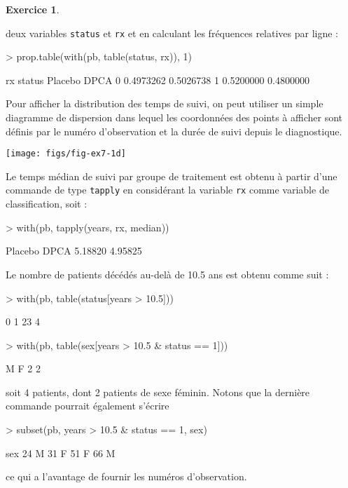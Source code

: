 \documentclass[11pt]{report}
\theoremstyle{definition}
\newtheorem{exo}{Exercice}[chapter]
\begin{document}
\begin{exo}
\begin{sol}
deux variables \texttt{status} et \texttt{rx} et en calculant les fréquences
relatives par ligne :
\begin{Schunk}
\begin{Sinput}
> prop.table(with(pb, table(status, rx)), 1)
\end{Sinput}
\begin{Soutput}
      rx
status   Placebo      DPCA
     0 0.4973262 0.5026738
     1 0.5200000 0.4800000
\end{Soutput}
\end{Schunk}
Pour afficher la distribution des temps de suivi, on peut utiliser un simple
diagramme de dispersion dans lequel les coordonnées des points à afficher
sont définis par le numéro d'observation et la durée de suivi depuis le
diagnostique. 
\begin{Schunk}
\end{Schunk}
\texttt{[image: figs/fig-ex7-1d]}

Le temps médian de suivi par groupe de traitement est obtenu à partir d'une
commande de type \texttt{tapply} en considérant la variable \texttt{rx}
comme variable de classification, soit :
\begin{Schunk}
\begin{Sinput}
> with(pb, tapply(years, rx, median))
\end{Sinput}
\begin{Soutput}
Placebo    DPCA 
5.18820 4.95825 
\end{Soutput}
\end{Schunk}
Le nombre de patients décédés au-delà de 10.5 ans est obtenu comme suit :
\begin{Schunk}
\begin{Sinput}
> with(pb, table(status[years > 10.5]))
\end{Sinput}
\begin{Soutput}
 0  1 
23  4 
\end{Soutput}
\begin{Sinput}
> with(pb, table(sex[years > 10.5 & status == 1]))
\end{Sinput}
\begin{Soutput}
M F 
2 2 
\end{Soutput}
\end{Schunk}
soit 4 patients, dont 2 patients de sexe féminin. Notons que la dernière
commande pourrait également s'écrire 
\begin{Schunk}
\begin{Sinput}
> subset(pb, years > 10.5 & status == 1, sex)
\end{Sinput}
\begin{Soutput}
   sex
24   M
31   F
51   F
66   M
\end{Soutput}
\end{Schunk}
ce qui a l'avantage de fournir les numéros d'observation.


\end{sol}
\end{exo}
\end{document}
